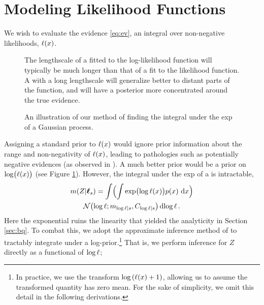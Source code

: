 \documentclass{article}
\begin{document}
\section{Modeling Likelihood Functions}\label{sec:model_lik}

We wish to evaluate the evidence \eqref{eq:ev}, an integral over non-negative likelihoods, $\lfn(\lfv)$.
%
 \begin{figure}
 \centering
 \caption{The lengthscale of a \gpb fitted to the log-likelihood function will typically be much longer than that of a \gpb fit to the likelihood function.  A \gpb with a long lengthscale will generalize better to distant parts of the function, and will have a posterior more concentrated around the true evidence. }
 \label{fig:log_is_better}
 \end{figure}
%
\begin{figure}
\centering
{}
\caption{An illustration of our method of finding the integral under the exp of a Gaussian process.}
\label{fig:delta}
\end{figure}
%
Assigning a standard \gpb prior to $\lfn(\lfv)$ would ignore prior information about the range and non-negativity of $\lfn(\lfv)$, leading to pathologies such as potentially negative evidences (as observed in \citet{BZMonteCarlo}).  A much better prior would be a \gpb prior on $\log\bigl(\lfn(x)\bigr)$ (see Figure \ref{fig:log_is_better}). However, the integral under the exp of a \gpb is intractable,
% 
\begin{multline}\label{eq:minty_l}
\mean{\If}{\vr_s}
 =\int \Bigl( \int \exp\bigl(\tr(\lfv)\bigr)\po{\lfv}\,\ud\lfv\Bigr)\\
\N{\tr}{\meancondfn{\tr}{s}}{C_{\tr|s}} \ud \tr\,.
\end{multline}
%
Here the exponential ruins the linearity that yielded the analyticity in Section \ref{sec:bq}. To combat this, we adopt the approximate inference method of \citep{BQR} to tractably integrate under a log-\gpb prior.\footnote{In practice, we use the transform 
$\log\left(\lfn(\lfv) + 1\right)$, allowing us to assume the transformed quantity has zero mean. For the sake of simplicity, we omit this detail in the following derivations.} That is, we perform inference for $Z$ directly as a functional of $\tr$;
\end{document}
